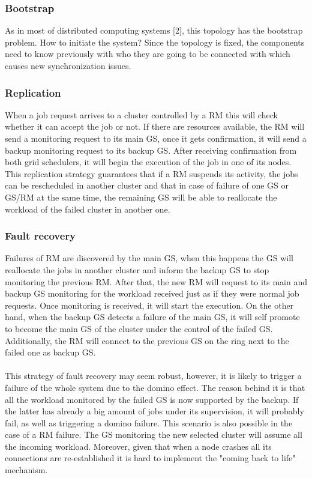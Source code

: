 \subsubsection{Bootstrap}
As in most of distributed computing systems [2], this topology has the bootstrap problem. How to initiate the system? Since the topology is fixed, the components need to know previously with who they are going to be connected with which causes new synchronization issues.

\subsubsection{Replication}
When a job request arrives to a cluster controlled by a RM this will check whether it can accept the job or not. If there are resources available, the RM will send a monitoring request to its main GS, once it gets confirmation, it will send a backup monitoring request to its backup GS. After receiving confirmation from both grid schedulers, it will begin the execution of the job in one of its nodes. This replication strategy guarantees that if a RM suspends its activity, the jobs can be rescheduled in another cluster and that in case of failure of one GS or GS/RM at the same time, the remaining GS will be able to reallocate the workload of the failed cluster in another one.

\subsubsection{Fault recovery}
Failures of RM are discovered by the main GS, when this happens the GS will reallocate the jobs in another cluster and inform the backup GS to stop monitoring the previous RM. After that, the new RM will request to its main and backup GS monitoring for the workload received just as if they were normal job requests. Once monitoring is received, it will start the execution.
On the other hand, when the backup GS detects a failure of the main GS, it will self promote to become the main GS of the cluster under the control of the failed GS. Additionally, the RM will connect to the previous GS on the ring next to the failed one as backup GS.
\\\\
This strategy of fault recovery may seem robust, however, it is likely to trigger a failure of the whole system due to the domino effect. The reason behind it is that all the workload monitored by the failed GS is now supported by the backup. If the latter has already a big amount of jobs under its supervision, it will probably fail, as well as triggering a domino failure. This scenario is also possible in the case of a RM failure. The GS monitoring the new selected cluster will assume all the incoming workload. Moreover, given that when a node crashes all its connections are re-established it is hard to implement the "coming back to life" mechanism.

